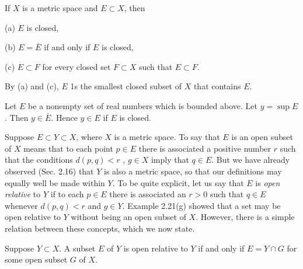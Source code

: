 \begin{thm}
    If $X$ is a metric space and $E \subset X$, then
    
    (a) $E$ is closed,
    
    (b) $E = \bar{E}$ if and only if $E$ is closed,
    
    (c) $E \subset F$ for every closed set $F \subset X$ such that $E \subset F$.
\end{thm}
By (a) and (c), $E$ 1s the smallest closed subset of $X$ that contains $E$.

\begin{thm}
    Let $E$ be a nonempty set of real numbers which is bounded above.     Let $y = \sup E$. Then $y \in \bar{E}$. Hence $y \in E$ if $E$ is closed.
\end{thm}

\begin{myRemark}
    Suppose $E \subset Y \subset X$, where $X$ is a metric space. To say that $E$ is an open subset of $X$ means that to each point $p \in E$ there is associated a positive number $r$ such that the conditions $d(p,q) < r$ , $g \in X$ imply that $q \in E$. But we have already observed (Sec. 2.16) that $Y$ is also a metric space, so that our definitions may equally well be made within $Y$. To be quite explicit, let us say that $E$ is \emph{open relative} to $Y$ if to each $p \in E$ there is associated an $r > 0$ such that $q \in E$ whenever $d(p,q) <r$ and $g \in Y$. Example 2.21(g) showed that a set 
    may be open relative to $Y$ without being an open subset of $X$. However, there is a simple relation between these concepts, which we now state.
\end{myRemark}

\begin{thm}
    Suppose $Y \subset X$. A subset $E$ of $Y$ is open relative to $Y$ if and only if $E = Y \cap G$ for some open subset $G$ of $X$.
\end{thm}